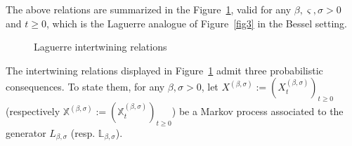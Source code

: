 \documentclass[10pt]{amsart}
\theoremstyle{definition}\newtheorem{defi}[theo]{Definition}\newtheorem{rema}[theo]{Remark}\newtheorem{exam}[theo]{Example}\newtheorem{exem}[theo]{Example}\newtheorem{nota}[theo]{Notation}
\newcommand{\df}{\mathrel{:=}}
\newcommand{\fn}{\mathfrak{n}}
\newcommand{\fX}{\mathbb{X}}
\newcommand{\wit}{\widehat}
\newcommand{\dLg}{{\discret{L}}}
\newcommand{\Lg}{L}
\newcommand{\dLs}{{\discret{K}}}
\newcommand{\Ls}{K}
\newcommand{\esL}{\mathbf{L}}
\newcommand{\esLd}{\ell}
\newcommand{\discret}[1]{\mathds{#1}}
\begin{document}
The above relations are summarized in the Figure~\ref{fig4}, valid for any $\beta,\varsigma,\sigma>0$ and $t\geq 0$, which is the Laguerre analogue of Figure~\ref{fig3} in the Bessel setting.
\begin{figure}[ht]\centering
{}
\caption{Laguerre intertwining relations}\label{fig4}
\end{figure}


The intertwining relations displayed in Figure~\ref{fig4} admit three probabilistic consequences. To state them, for any $\beta,\sigma>0$, let $X^{(\beta,\sigma)}\df(X_t^{(\beta,\sigma)})_{t\geq 0}$ (respectively $\fX^{(\beta,\sigma)}\df(\fX_t^{(\beta,\sigma)})_{t\geq 0}$) be a Markov process associated to the generator $\Lg_{\beta,\sigma}$ (resp. $\dLg_{\beta,\sigma}$).
\end{document}
